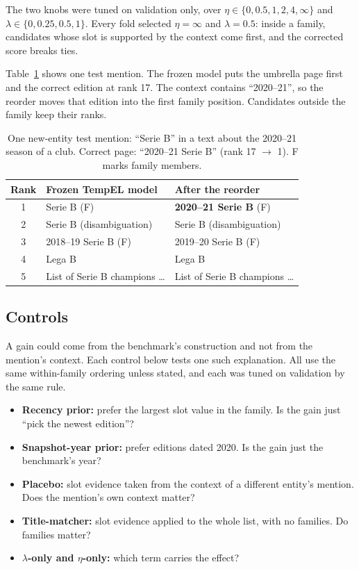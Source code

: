 \documentclass[conference]{IEEEtran}
\begin{document}
The two knobs were tuned on validation only, over $\eta \in \{0, 0.5, 1, 2, 4, \infty\}$ and
$\lambda \in \{0, 0.25, 0.5, 1\}$. Every fold selected $\eta = \infty$ and $\lambda = 0.5$: inside a
family, candidates whose slot is supported by the context come first, and the corrected score breaks
ties.

Table~\ref{tab:example} shows one test mention. The frozen model puts the umbrella page first and the
correct edition at rank 17. The context contains ``2020--21'', so the reorder moves that edition into
the first family position. Candidates outside the family keep their ranks.

\begin{table}[t]
\caption{One new-entity test mention: ``Serie B'' in a text about the 2020--21 season of a club.
Correct page: ``2020--21 Serie B'' (rank 17 $\rightarrow$ 1). F marks family members.}
\label{tab:example}
\centering
\footnotesize
\begin{tabular}{cll}
\toprule
Rank & Frozen TempEL model & After the reorder \\
\midrule
1 & Serie B (F) & \textbf{2020--21 Serie B} (F) \\
2 & Serie B (disambiguation) & Serie B (disambiguation) \\
3 & 2018--19 Serie B (F) & 2019--20 Serie B (F) \\
4 & Lega B & Lega B \\
5 & List of Serie B champions \ldots & List of Serie B champions \ldots \\
\bottomrule
\end{tabular}
\end{table}

\subsection{Controls}

A gain could come from the benchmark's construction and not from the mention's context. Each control
below tests one such explanation. All use the same within-family ordering unless stated, and each was
tuned on validation by the same rule.
\begin{itemize}
\item \textbf{Recency prior:} prefer the largest slot value in the family. Is the gain just ``pick the
newest edition''?
\item \textbf{Snapshot-year prior:} prefer editions dated 2020. Is the gain just the benchmark's year?
\item \textbf{Placebo:} slot evidence taken from the context of a different entity's mention. Does the
mention's own context matter?
\item \textbf{Title-matcher:} slot evidence applied to the whole list, with no families. Do families
matter?
\item \textbf{$\lambda$-only and $\eta$-only:} which term carries the effect?
\end{itemize}
\end{document}
